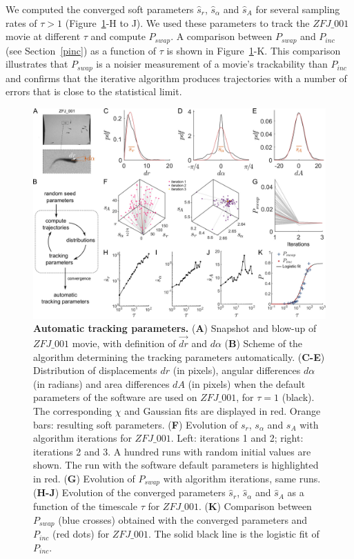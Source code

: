     We computed the converged soft parameters $\hat{s}_r$, $\hat{s}_\alpha$ and $\hat{s}_A$ for several sampling rates of $\tau>1$ (Figure~\ref{part_1:fig_5}-H to J). We used these parameters to track the $ZFJ\_001$ movie at different $\tau$ and compute $P_{swap}$. A comparison between $P_{swap}$ and $P_{inc}$ (see Section~\ref{pinc}) as a function of $\tau$ is shown in Figure~\ref{part_1:fig_5}-K. This comparison illustrates that $P_{swap}$ is a noisier measurement of a movie's trackability than $P_{inc}$ and confirms that the iterative algorithm produces trajectories with a number of errors that is close to the statistical limit.

    \begin{figure}[h!]
    \centering
    \includegraphics[width=1\textwidth]{part_1/assets/Figure_5.png}
    \caption{{\bf Automatic tracking parameters.}
        (\textbf{A}) Snapshot and blow-up of $ZFJ\_001$ movie, with definition of $\vec{dr}$ and $d\alpha$
        (\textbf{B}) Scheme of the algorithm determining the tracking parameters automatically.
        (\textbf{C-E}) Distribution of displacements $dr$ (in pixels), angular differences $d\alpha$ (in radians) and area differences $dA$ (in pixels) when the default parameters of the software are used on $ZFJ\_001$, for $\tau=1$ (black). The corresponding $\chi$ and Gaussian fits are displayed in red. Orange bars: resulting soft parameters.
        (\textbf{F}) Evolution of $s_r$, $s_\alpha$ and $s_A$ with algorithm iterations for $ZFJ\_001$. Left: iterations 1 and 2; right: iterations 2 and 3. A hundred runs with random initial values are shown. The run with the software default parameters is highlighted in red.
        (\textbf{G}) Evolution of $P_{swap}$ with algorithm iterations, same runs.
        (\textbf{H-J}) Evolution of the converged parameters $\hat{s}_r$, $\hat{s}_\alpha$ and $\hat{s}_A$ as a function of the timescale $\tau$ for $ZFJ\_001$.
        (\textbf{K}) Comparison between $P_{swap}$ (blue crosses) obtained with the converged parameters and $P_{inc}$ (red dots) for $ZFJ\_001$. The solid black line is the logistic fit of $P_{inc}$.}
    \label{part_1:fig_5}
    \end{figure}

